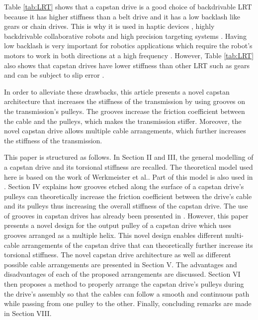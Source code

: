 \par Table \ref{tab:LRT} shows that a capstan drive is a good choice of backdrivable LRT because it has higher stiffness than a belt drive and it has a low backlash like gears or chain drives. This is why it is used in haptic devices \cite{perret2014advantages}\cite{baser2013kinematic}, highly backdrivable collaborative robots \cite{townsend1988effect}\cite{rooks2006harmonious}\cite{phan2014guided} and high precision targeting systems \cite{lu2015development}\cite{lu2012non}\cite{lu2013transmission}\cite{xie2019analytical}. Having low backlash is very important for  robotics applications which require the robot's motors to work in both directions at a high frequency \cite{brooks1990telerobotic}\cite{gealy2019quasi}. However, Table \ref{tab:LRT} also shows that capstan drives have lower stiffness than other LRT such as gears and can be subject to slip error \cite{lu2013transmission}\cite{baser2010theoretical}.\par
In order to alleviate these drawbacks, this article presents a novel capstan architecture that increases the stiffness of the transmission by using grooves on the transmission's pulleys. The grooves increase the friction coefficient between the cable and the pulleys, which makes the transmission stiffer. Moreover, the novel capstan drive allows multiple cable arrangements, which further increases the stiffness of the transmission.\par This paper is structured as follows. In Section II and III, the general modelling of a capstan drive and its torsional stiffness are recalled. The theoretical model used here is based on the work of Werkmeister et al.\cite{werkmeister2007theoretical}. Part of this model is also used in \cite{baser2010theoretical}. Section IV explains how grooves etched along the surface of a capstan drive's pulleys can theoretically increase the friction coefficient between the drive's cable and its pulleys thus increasing the overall stiffness of the capstan drive. The use of grooves in capstan drives has already been presented in \cite{lu2012non}. However, this paper presents a novel design for the output pulley of a capstan drive which uses grooves arranged as a multiple helix. This novel design enables different multi-cable arrangements of the capstan drive that can theoretically further increase its torsional stiffness. The novel capstan drive architecture as well as different possible cable arrangements are presented in Section V. The advantages and disadvantages  of each of the proposed arrangements are discussed. Section VI then proposes a method to properly arrange the capstan drive's pulleys during the drive's assembly so that the cables can follow a smooth and continuous path while passing from one pulley to the other. Finally, concluding remarks are made in Section VIII.
